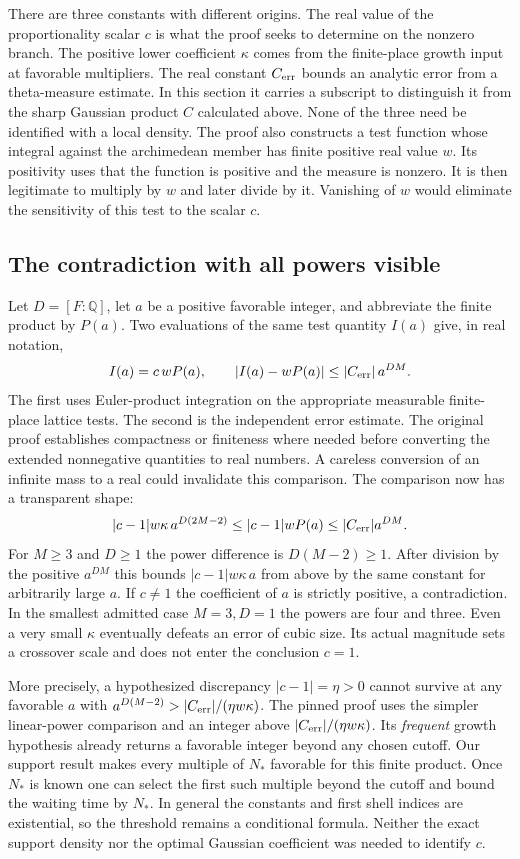 \documentclass[12pt,letterpaper]{article}
\begin{document}
There are three constants with different origins. The real value of the proportionality scalar $c$ is what the proof seeks to determine on the nonzero branch. The positive lower coefficient $\kappa$ comes from the finite-place growth input at favorable multipliers. The real constant $C_{\rm err}$ bounds an analytic error from a theta-measure estimate. In this section it carries a subscript to distinguish it from the sharp Gaussian product $C$ calculated above. None of the three need be identified with a local density. The proof also constructs a test function whose integral against the archimedean member has finite positive real value $w$. Its positivity uses that the function is positive and the measure is nonzero. It is then legitimate to multiply by $w$ and later divide by it. Vanishing of $w$ would eliminate the sensitivity of this test to the scalar $c$.

\subsection{The contradiction with all powers visible}
Let $D=[F:\mathbb Q]$, let $a$ be a positive favorable integer, and abbreviate the finite product by $P(a)$. Two evaluations of the same test quantity $I(a)$ give, in real notation,
\[
 I(a)=c\,wP(a), \qquad
       |I(a)-wP(a)|\le |C_{\rm err}|\,a^{DM}.
\]
The first uses Euler-product integration on the appropriate measurable finite-place lattice tests. The second is the independent error estimate. The original proof establishes compactness or finiteness where needed before converting the extended nonnegative quantities to real numbers. A careless conversion of an infinite mass to a real could invalidate this comparison. The comparison now has a transparent shape:
\[
     |c-1|w\kappa\,a^{D(2M-2)}
        \le |c-1|w P(a)
        \le |C_{\rm err}|a^{DM}.
\]
For $M\ge3$ and $D\ge1$ the power difference is $D(M-2)\ge1$. After division by the positive $a^{DM}$ this bounds $|c-1|w\kappa\,a$ from above by the same constant for arbitrarily large $a$. If $c\ne1$ the coefficient of $a$ is strictly positive, a contradiction. In the smallest admitted case $M=3,D=1$ the powers are four and three. Even a very small $\kappa$ eventually defeats an error of cubic size. Its actual magnitude sets a crossover scale and does not enter the conclusion $c=1$.

More precisely, a hypothesized discrepancy $|c-1|=\eta>0$ cannot survive at any favorable $a$ with $a^{D(M-2)}>|C_{\rm err}|/(\eta w\kappa)$. The pinned proof uses the simpler linear-power comparison and an integer above $|C_{\rm err}|/(\eta w\kappa)$. Its \emph{frequent} growth hypothesis already returns a favorable integer beyond any chosen cutoff. Our support result makes every multiple of $N_*$ favorable for this finite product. Once $N_*$ is known one can select the first such multiple beyond the cutoff and bound the waiting time by $N_*$. In general the constants and first shell indices are existential, so the threshold remains a conditional formula. Neither the exact support density nor the optimal Gaussian coefficient was needed to identify $c$.
\end{document}
